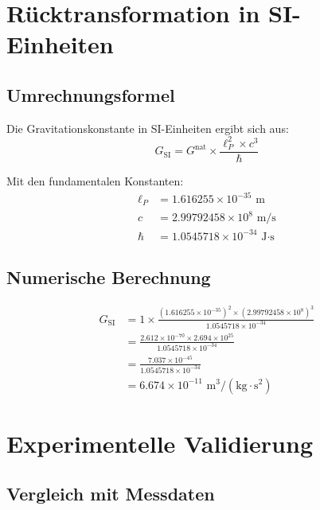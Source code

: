 \documentclass[12pt,a4paper]{article}
\theoremstyle{definition}
\begin{document}
	\section{Rücktransformation in SI-Einheiten}
	
	\subsection{Umrechnungsformel}
	
	Die Gravitationskonstante in SI-Einheiten ergibt sich aus:
	\begin{equation}
		G_{\text{SI}} = G^{\text{nat}} \times \frac{\ell_P^2 \times c^3}{\hbar}
	\end{equation}
	
	Mit den fundamentalen Konstanten:
	\begin{align}
		\ell_P &= 1.616255 \times 10^{-35} \text{ m}\\
		c &= 2.99792458 \times 10^8 \text{ m/s}\\
		\hbar &= 1.0545718 \times 10^{-34} \text{ J·s}
	\end{align}
	
	\subsection{Numerische Berechnung}
	
	\begin{align}
		G_{\text{SI}} &= 1 \times \frac{(1.616255 \times 10^{-35})^2 \times (2.99792458 \times 10^8)^3}{1.0545718 \times 10^{-34}}\\
		&= \frac{2.612 \times 10^{-70} \times 2.694 \times 10^{25}}{1.0545718 \times 10^{-34}}\\
		&= \frac{7.037 \times 10^{-45}}{1.0545718 \times 10^{-34}}\\
		&= 6.674 \times 10^{-11} \text{ m}^3/(\text{kg} \cdot \text{s}^2)
	\end{align}
	
	\section{Experimentelle Validierung}
	
	\subsection{Vergleich mit Messdaten}
	
\end{document}
